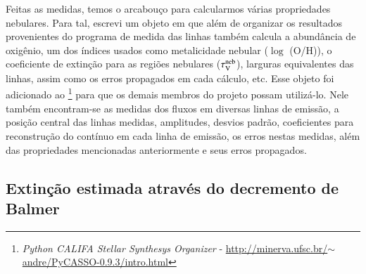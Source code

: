 Feitas as medidas, temos o arcabouço para calcularmos várias propriedades nebulares. Para tal,
escrevi um objeto em \pyt que além de organizar os resultados provenientes do programa de medida
das linhas também calcula a abundância de oxigênio, um dos índices usados como metalicidade nebular
($\log$ (O/H)), o coeficiente de extinção para as regiões nebulares ($\tau_{\mathrm{V}}^{\mathrm{neb}}$), larguras
equivalentes das linhas, assim como os erros propagados em cada cálculo, etc. Esse objeto foi
adicionado ao \pycasso\footnote{ {\em Python CALIFA Stellar Synthesys Organizer} - \href{
http://minerva.ufsc.br/~andre/PyCASSO-0.9.3/intro.html }{
http://minerva.ufsc.br/$\sim$andre/PyCASSO-0.9.3/intro.html} } \citep{CidFernandes.etal.2013a} para
que os demais membros do projeto possam utilizá-lo. Nele também encontram-se as medidas dos fluxos
em diversas linhas de emissão, a posição central das linhas medidas, amplitudes, desvios padrão,
coeficientes para reconstrução do contínuo em cada linha de emissão, os erros nestas medidas, além
das propriedades mencionadas anteriormente e seus erros propagados.

\subsection{Extinção estimada através do decremento de Balmer}
\label{sec:emline:datacube:tauvneb}

